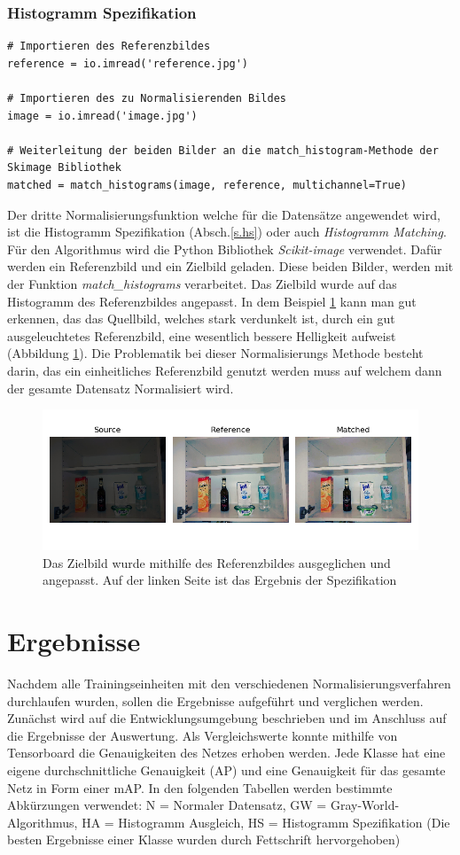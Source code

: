 \documentclass[a4paper,12pt,oneside]{article}
\begin{document}
\subsubsection{Histogramm Spezifikation}
\begin{lstlisting}
# Importieren des Referenzbildes
reference = io.imread('reference.jpg')

# Importieren des zu Normalisierenden Bildes
image = io.imread('image.jpg')

# Weiterleitung der beiden Bilder an die match_histogram-Methode der Skimage Bibliothek
matched = match_histograms(image, reference, multichannel=True)
\end{lstlisting}
Der dritte Normalisierungsfunktion welche für die Datensätze angewendet wird, ist die Histogramm Spezifikation (Absch.\ref{s.hs}) oder auch \textit{Histogramm Matching}. Für den Algorithmus wird die Python Bibliothek \textit{Scikit-image} verwendet. Dafür werden ein Referenzbild und ein Zielbild geladen. Diese beiden Bilder, werden mit der Funktion \textit{match\_histograms} verarbeitet. Das Zielbild wurde auf das Histogramm des Referenzbildes angepasst. In dem Beispiel \ref{img:histogramspez} kann man gut erkennen, das das Quellbild, welches stark verdunkelt ist, durch ein gut ausgeleuchtetes Referenzbild, eine wesentlich bessere Helligkeit aufweist (Abbildung \ref{img:histogramspez}). Die Problematik bei dieser Normalisierungs Methode besteht darin, das ein einheitliches Referenzbild genutzt werden muss auf welchem dann der gesamte Datensatz Normalisiert wird.
\begin{figure}
	[h]
	\centering
	\includegraphics[scale=0.8]{Sources/HS_beispiel.png}
	\caption{Das Zielbild wurde mithilfe des Referenzbildes ausgeglichen und angepasst. Auf der linken Seite ist das Ergebnis der Spezifikation}
	\label{img:histogramspez}
\end{figure}
  \newpage
\section{Ergebnisse}\label{s.ergebnisse}
Nachdem alle Trainingseinheiten mit den verschiedenen Normalisierungsverfahren durchlaufen wurden, sollen die Ergebnisse aufgeführt und verglichen werden. Zunächst wird auf die Entwicklungsumgebung beschrieben und im Anschluss auf die Ergebnisse der Auswertung. Als Vergleichswerte konnte mithilfe von Tensorboard die Genauigkeiten des Netzes erhoben werden. Jede Klasse hat eine eigene durchschnittliche Genauigkeit (AP) und eine Genauigkeit für das gesamte Netz in Form einer mAP. In den folgenden Tabellen werden bestimmte Abkürzungen verwendet: N = Normaler Datensatz, GW = Gray-World-Algorithmus, HA = Histogramm Ausgleich, HS = Histogramm Spezifikation (Die besten Ergebnisse einer Klasse wurden durch Fettschrift hervorgehoben) 
\end{document}
